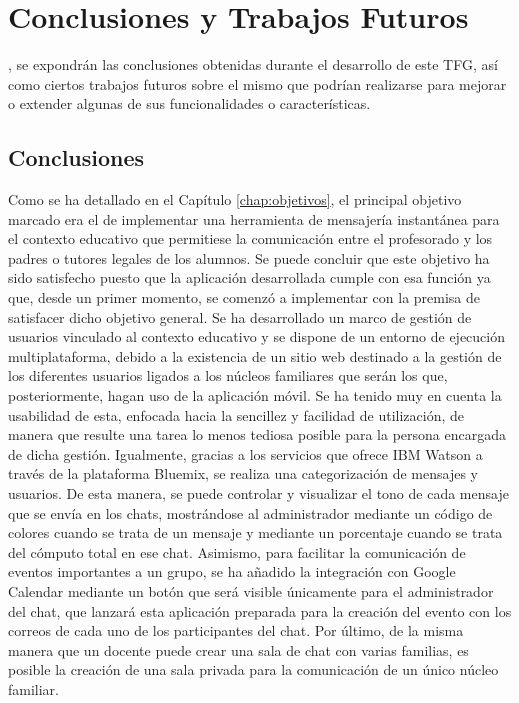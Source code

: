 \chapter{Conclusiones y Trabajos Futuros}
\label{chap:conclusiones}

, se expondrán las conclusiones obtenidas durante el desarrollo de este \acs{TFG}, así como ciertos trabajos futuros sobre el mismo que podrían realizarse para mejorar o extender algunas de sus funcionalidades o características.

\section{Conclusiones}
Como se ha detallado en el Capítulo \ref{chap:objetivos}, el principal objetivo marcado era el de implementar una herramienta de mensajería instantánea para el contexto educativo que permitiese la comunicación entre el profesorado y los padres o tutores legales de los alumnos. Se puede concluir que este objetivo ha sido satisfecho puesto que la aplicación desarrollada cumple con esa función ya que, desde un primer momento, se comenzó a implementar con la premisa de satisfacer dicho objetivo general. Se ha desarrollado un marco de gestión de usuarios vinculado al contexto educativo y se dispone de un entorno de ejecución multiplataforma, debido a la existencia de un sitio web destinado a la gestión de los diferentes usuarios ligados a los núcleos familiares que serán los que, posteriormente, hagan uso de la aplicación móvil. Se ha tenido muy en cuenta la usabilidad de esta, enfocada hacia la sencillez y facilidad de utilización, de manera que resulte una tarea lo menos tediosa posible para la persona encargada de dicha gestión. Igualmente, gracias a los servicios que ofrece IBM Watson a través de la plataforma Bluemix, se realiza una categorización de mensajes y usuarios. De esta manera, se puede controlar y visualizar el tono de cada mensaje que se envía en los chats, mostrándose al administrador mediante un código de colores cuando se trata de un mensaje y mediante un porcentaje cuando se trata del cómputo total en ese chat. Asimismo, para facilitar la comunicación de eventos importantes a un grupo, se ha añadido la integración con Google Calendar mediante un botón que será visible únicamente para el administrador del chat, que lanzará esta aplicación preparada para la creación del evento con los correos de cada uno de los participantes del chat. Por último, de la misma manera que un docente puede crear una sala de chat con varias familias, es posible la creación de una sala privada para la comunicación de un único núcleo familiar.

